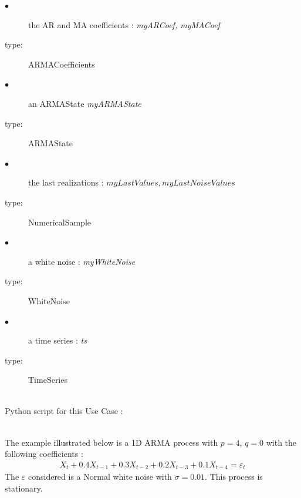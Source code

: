{

  \begin{description}
  \item[$\bullet$] the AR and MA coefficients : {\itshape myARCoef, myMACoef}
  \item[type:]  ARMACoefficients
  \end{description}

  \begin{description}
  \item[$\bullet$] an ARMAState {\itshape myARMAState}
  \item[type:]  ARMAState
  \end{description}

  \begin{description}
  \item[$\bullet$] the last realizations : {\itshape $myLastValues, myLastNoiseValues$}
  \item[type:]  NumericalSample
  \end{description}

  \begin{description}
  \item[$\bullet$] a white noise : {\itshape myWhiteNoise}
  \item[type:]  WhiteNoise
  \end{description}

  \begin{description}
  \item[$\bullet$] a time series : {\itshape ts}
  \item[type:]  TimeSeries
  \end{description}
}

\textspace\\
Python script for this Use Case :


\textspace\\
The example illustrated  below is a 1D ARMA process with $p = 4$, $q=0$ with the following coefficients :
\begin{align*}
  X_t + 0.4X_{t-1} + 0.3X_{t-2} + 0.2X_{t-3} + 0.1X_{t-4} = \varepsilon_{t}
\end{align*}
The $\varepsilon$ considered is a Normal white noise with $\sigma = 0.01$. This process is stationary.\\

